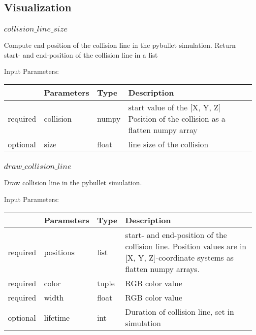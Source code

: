 \documentclass[
	ngerman,
	accentcolor=9c,%
	type=intern,
	marginpar=false
	]{tudapub}
\begin{document}
\subsection{Visualization}
\subsubsection{$collision\_line\_size$}
\noindent Compute end position of the collision line in the pybullet simulation. Return start- and end-position of the collision line in a list



\vspace{0.5cm}
\noindent Input Parameters:
\vspace{0.5cm}

\begin{tabular}{|p{}|p{}|p{}| p{}|}
\hline
 & \textbf{Parameters} & \textbf{Type} & \textbf{Description} \\
\hline
required & collision & numpy & start value of the [X, Y, Z] Position of the collision as a flatten numpy array\\
\hline
optional & size & float & line size of the collision\\
\hline
\end{tabular}
\vspace{0.5cm}



\subsubsection{$draw\_collision\_line$}
\noindent Draw collision line in the pybullet simulation. 



\vspace{0.5cm}
\noindent Input Parameters:
\vspace{0.5cm}

\begin{tabular}{|p{}|p{}|p{}| p{}|}
\hline
 & \textbf{Parameters} & \textbf{Type} & \textbf{Description} \\
\hline
required & positions & list & start- and end-position of the collision line. Position values are in [X, Y, Z]-coordinate systems as flatten numpy arrays. \\
\hline
required & color & tuple & RGB color value\\
\hline
required & width & float & RGB color value\\
\hline
optional & lifetime & int & Duration of collision line, set in simulation\\
\hline
\end{tabular}
\vspace{0.5cm}
\end{document}
